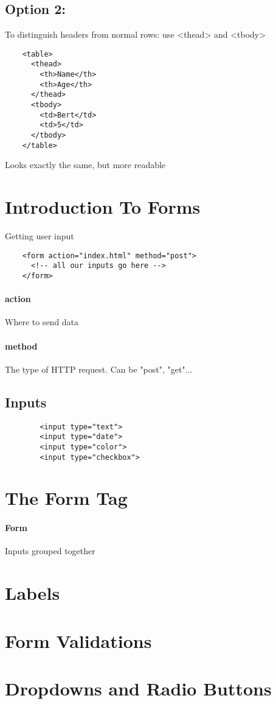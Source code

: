 \documentclass{article}
\begin{document}
	\subsection{Option 2:}
	To distinguish headers from normal rows: use <thead> and <tbody>
	\begin{verbatim}
	<table>
	  <thead>
	    <th>Name</th>
	    <th>Age</th>
	  </thead>
	  <tbody>
	    <td>Bert</td>
	    <td>5</td>
	  </tbody>
	</table>
	\end{verbatim}
	
	Looks exactly the same, but more readable

\section{Introduction To Forms}
	Getting user input

	\begin{verbatim}
	<form action="index.html" method="post">
	  <!-- all our inputs go here -->
	</form>
	\end{verbatim}
	
	\paragraph*{action}
	Where to send data
	\paragraph*{method}
	The type of HTTP request. Can be "post", "get"...
	
	\subsection{Inputs}
	\begin{verbatim}
		<input type="text">
		<input type="date">
		<input type="color">
		<input type="checkbox">
	\end{verbatim}

\section{The Form Tag}
\paragraph*{Form}
Inputs grouped together

\section{Labels}
\section{Form Validations}
\section{Dropdowns and Radio Buttons}
\end{document}
